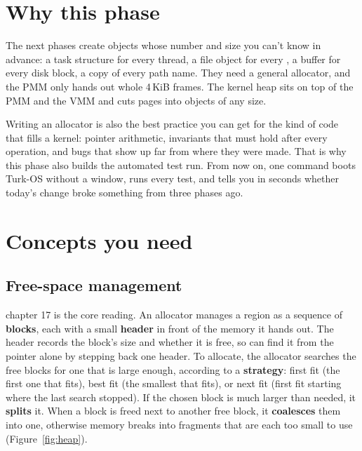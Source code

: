 \documentclass[11pt,a4paper]{article}
\begin{document}


\section{Why this phase}

The next phases create objects whose number and size you can't know in advance: a task structure for every thread,
a file object for every , a buffer for every disk block, a copy of every path name. They need a general
allocator, and the PMM only hands out whole 4\,KiB frames. The kernel heap sits on top of the PMM and the VMM and
cuts pages into objects of any size.

Writing an allocator is also the best practice you can get for the kind of code that fills a kernel: pointer
arithmetic, invariants that must hold after every operation, and bugs that show up far from where they were made.
That is why this phase also builds the automated test run. From now on, one command boots Turk-OS without a window,
runs every test, and tells you in seconds whether today's change broke something from three phases ago.

\section{Concepts you need}

\subsection{Free-space management}

\OSTEP chapter 17 is the core reading. An allocator manages a region as a sequence of \textbf{blocks}, each with a
small \textbf{header} in front of the memory it hands out. The header records the block's size and whether it is
free, so  can find it from the pointer alone by stepping back one header. To allocate, the allocator
searches the free blocks for one that is large enough, according to a \textbf{strategy}: first fit (the first one
that fits), best fit (the smallest that fits), or next fit (first fit starting where the last search stopped). If the
chosen block is much larger than needed, it \textbf{splits} it. When a block is freed next to another free block, it
\textbf{coalesces} them into one, otherwise memory breaks into fragments that are each too small to use
(Figure~\ref{fig:heap}).
\end{document}
